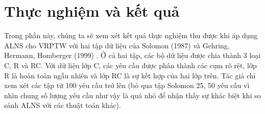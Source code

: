 \chapter{Thực nghiệm và kết quả}
\label{chap:experiment}

Trong phần này, chúng ta sẽ xem xét kết quả thực nghiệm thu được khi áp dụng ALNS cho VRPTW với hai tập dữ liệu của Solomon (1987) \cite{solomon1987algorithms} và Gehring, Hermann, Homberger (1999) \cite{gehring1999parallel}. Ở cả hai tập, các bộ dữ liệu được chia thành 3 loại C, R và RC. Với dữ liệu lớp C, các yêu cầu được phân thành các cụm rõ rệt, lớp R là hoàn toàn ngẫu nhiên và lớp RC là sự kết hợp của hai lớp trên. Tác giả chỉ xem xét các tập từ 100 yêu cầu trở lên (bỏ qua tập Solomon 25, 50 yêu cầu vì nhìn chung số lượng yêu cầu như vậy là quá nhỏ để nhận thấy sự khác biệt khi so sánh ALNS với các thuật toán khác).

